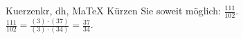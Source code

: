 \begin{MAufgabe}{Kuerzen}{kr, dh, MaTeX}
K\"urzen Sie soweit m\"oglich: $\frac{111}{102}$.\\ 
\ifLsg\MLoesung
\quad $\frac{111}{102}=\frac{(3)\cdot(37)}{(3)\cdot(34)}=\frac{37}{34}$.\else\relax\fi
 \end{MAufgabe}